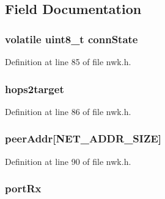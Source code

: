 \subsection{\-Field \-Documentation}
\hypertarget{structconnInfo__t_ae1d855f6177858d6085c9919b6f21f70}{
\subsubsection[{conn\-State}]{\setlength{\rightskip}{0pt plus 5cm}volatile {\bf uint8\-\_\-t} {\bf conn\-State}}}\label{structconnInfo__t_ae1d855f6177858d6085c9919b6f21f70}


\-Definition at line 85 of file nwk.\-h.

\hypertarget{structconnInfo__t_ab8fa97070b038197afbbd287e3d4ce17}{
\subsubsection[{hops2target}]{ {\bf hops2target}}}\label{structconnInfo__t_ab8fa97070b038197afbbd287e3d4ce17}


\-Definition at line 86 of file nwk.\-h.

\hypertarget{structconnInfo__t_abc4f4954179a390679e6ed1458753752}{
\subsubsection[{peer\-Addr}]{ {\bf peer\-Addr}\mbox{[}{\bf \-N\-E\-T\-\_\-\-A\-D\-D\-R\-\_\-\-S\-I\-Z\-E}\mbox{]}}}\label{structconnInfo__t_abc4f4954179a390679e6ed1458753752}


\-Definition at line 90 of file nwk.\-h.

\hypertarget{structconnInfo__t_adf1599d59a7e9d1f482180b183aab48b}{
\subsubsection[{port\-Rx}]{ {\bf port\-Rx}}}\label{structconnInfo__t_adf1599d59a7e9d1f482180b183aab48b}


